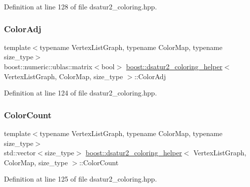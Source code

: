 Definition at line 128 of file dsatur2\+\_\+coloring.\+hpp.

\mbox{\label{classboost_1_1dsatur2__coloring__helper_a191c842010e866aba65b3b025455170f}} 
\subsubsection{\texorpdfstring{Color\+Adj}{ColorAdj}}
{\footnotesize\ttfamily template$<$typename Vertex\+List\+Graph, typename Color\+Map, typename size\+\_\+type$>$ \\
boost\+::numeric\+::ublas\+::matrix$<$bool$>$ \hyperlink{classboost_1_1dsatur2__coloring__helper}{boost\+::dsatur2\+\_\+coloring\+\_\+helper}$<$ Vertex\+List\+Graph, Color\+Map, size\+\_\+type $>$\+::Color\+Adj\hspace{0.3cm}{\ttfamily [private]}}



Definition at line 124 of file dsatur2\+\_\+coloring.\+hpp.

\mbox{\label{classboost_1_1dsatur2__coloring__helper_ad40e17e570c52272d09b5da508c6cde9}} 
\subsubsection{\texorpdfstring{Color\+Count}{ColorCount}}
{\footnotesize\ttfamily template$<$typename Vertex\+List\+Graph, typename Color\+Map, typename size\+\_\+type$>$ \\
std\+::vector$<$size\+\_\+type$>$ \hyperlink{classboost_1_1dsatur2__coloring__helper}{boost\+::dsatur2\+\_\+coloring\+\_\+helper}$<$ Vertex\+List\+Graph, Color\+Map, size\+\_\+type $>$\+::Color\+Count\hspace{0.3cm}{\ttfamily [private]}}



Definition at line 125 of file dsatur2\+\_\+coloring.\+hpp.

